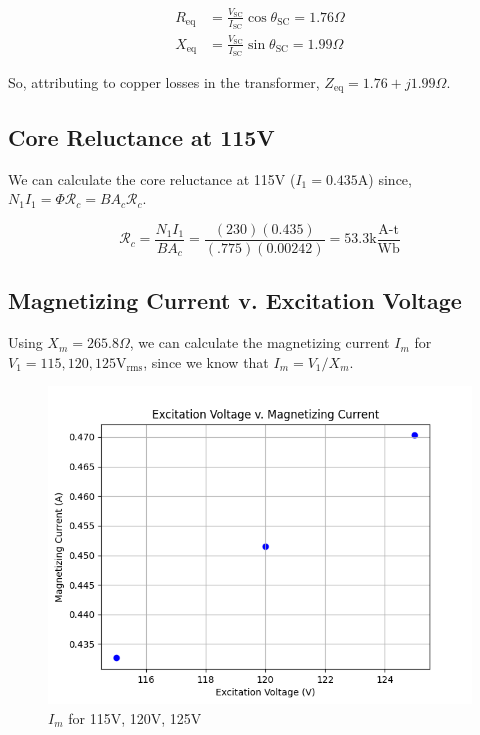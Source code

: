 \documentclass{IEEEtran}
\begin{document}
\begin{align}
    R_{\text{eq}} &= \frac{V_{\text{SC}}}{I_{\text{SC}}} \cos {\theta_{\text{SC}}} = 1.76\Omega\\
    X_{\text{eq}} &= \frac{V_{\text{SC}}}{I_{\text{SC}}} \sin {\theta_{\text{SC}}} = 1.99\Omega
\end{align}

So, attributing to copper losses in the transformer, \(Z_{\text{eq}} = 1.76 + j1.99 \Omega\). 

\subsection{Core Reluctance at 115V}

We can calculate the core reluctance at 115V (\(I_1 = 0.435\)A) since, \( N_1I_1 = \Phi \mathcal{R}_c = B A_c \mathcal{R}_c \).

\begin{equation*}
    \mathcal{R}_c = \frac{N_1 I_1}{B A_c} = \frac{(230)(0.435)}{(.775)(0.00242)} = 53.3  \text{k}\frac{\text{A-t}}{\text{Wb}}
\end{equation*}

\subsection{Magnetizing Current v. Excitation Voltage}

Using \(X_m = 265.8 \Omega\), we can calculate the magnetizing current \(I_m\) for \(V_1 = 115, 120, 125 \text{V}_\text{rms}\), since we know that \(I_m = V_1 / X_m\).

\begin{figure}[h!]
    \includegraphics[width=\columnwidth]{mag-current-plot.png}
    \caption{\(I_m\) for 115V, 120V, 125V} 
    \label{fig:mag-current}
\end{figure}
\end{document}
